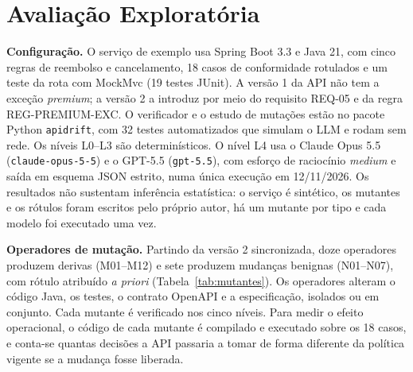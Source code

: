 \documentclass[12pt]{article}
\newcommand{\code}[1]{\texttt{#1}}
\begin{document}
\section{Avaliação Exploratória}
\label{sec5:preliminares}

\textbf{Configuração.} O serviço de exemplo usa Spring Boot 3.3 e Java 21, com cinco regras de reembolso e cancelamento, 18 casos de conformidade rotulados e um teste da rota com MockMvc (19 testes JUnit). A versão 1 da API não tem a exceção \textit{premium}; a versão 2 a introduz por meio do requisito REQ-05 e da regra REG-PREMIUM-EXC. O verificador e o estudo de mutações estão no pacote Python \code{apidrift}, com 32 testes automatizados que simulam o LLM e rodam sem rede. Os níveis L0--L3 são determinísticos. O nível L4 usa o Claude Opus 5.5 (\code{claude-opus-5-5}) e o GPT-5.5 (\code{gpt-5.5}), com esforço de raciocínio \textit{medium} e saída em esquema JSON estrito, numa única execução em 12/11/2026. Os resultados não sustentam inferência estatística: o serviço é sintético, os mutantes e os rótulos foram escritos pelo próprio autor, há um mutante por tipo e cada modelo foi executado uma vez.

\textbf{Operadores de mutação.} Partindo da versão 2 sincronizada, doze operadores produzem derivas (M01--M12) e sete produzem mudanças benignas (N01--N07), com rótulo atribuído \textit{a priori} (Tabela~\ref{tab:mutantes}). Os operadores alteram o código Java, os testes, o contrato OpenAPI e a especificação, isolados ou em conjunto. Cada mutante é verificado nos cinco níveis. Para medir o efeito operacional, o código de cada mutante é compilado e executado sobre os 18 casos, e conta-se quantas decisões a API passaria a tomar de forma diferente da política vigente se a mudança fosse liberada.
\end{document}
